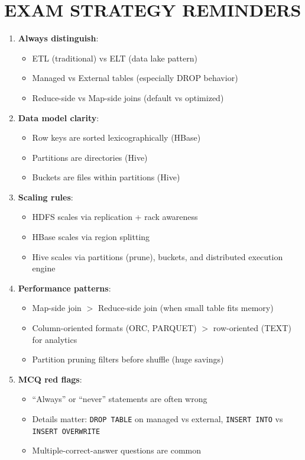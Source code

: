 \documentclass[11pt, onecolumn, a4paper]{article}
\begin{document}
\newpage
\section{EXAM STRATEGY REMINDERS}

\begin{enumerate}
  \item \textbf{Always distinguish}:
  \begin{itemize}
    \item ETL (traditional) vs ELT (data lake pattern)
    \item Managed vs External tables (especially DROP behavior)
    \item Reduce-side vs Map-side joins (default vs optimized)
  \end{itemize}

  \item \textbf{Data model clarity}:
  \begin{itemize}
    \item Row keys are sorted lexicographically (HBase)
    \item Partitions are directories (Hive)
    \item Buckets are files within partitions (Hive)
  \end{itemize}

  \item \textbf{Scaling rules}:
  \begin{itemize}
    \item HDFS scales via replication + rack awareness
    \item HBase scales via region splitting
    \item Hive scales via partitions (prune), buckets, and distributed execution engine
  \end{itemize}

  \item \textbf{Performance patterns}:
  \begin{itemize}
    \item Map-side join $>$ Reduce-side join (when small table fits memory)
    \item Column-oriented formats (ORC, PARQUET) $>$ row-oriented (TEXT) for analytics
    \item Partition pruning filters before shuffle (huge savings)
  \end{itemize}

  \item \textbf{MCQ red flags}:
  \begin{itemize}
    \item ``Always'' or ``never'' statements are often wrong
    \item Details matter: \texttt{DROP TABLE} on managed vs external, \texttt{INSERT INTO} vs \texttt{INSERT OVERWRITE}
    \item Multiple-correct-answer questions are common
  \end{itemize}
\end{enumerate}
\end{document}
